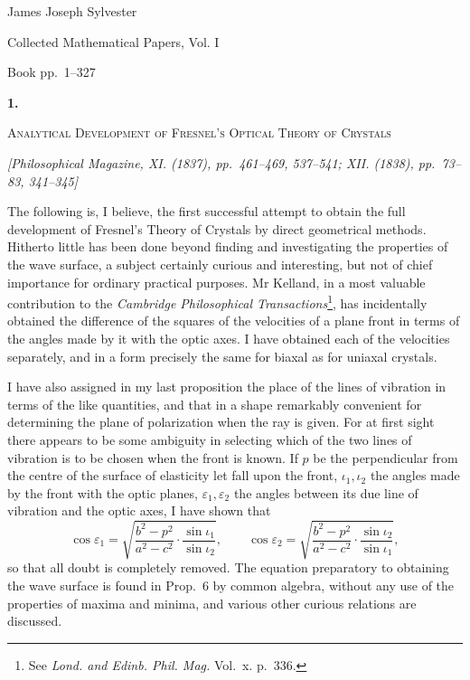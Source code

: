 \documentclass[11pt]{article}
\newcommand{\paperhead}[3]{%
  \clearpage
  \begin{center}
  {\Large\bfseries #1.}\par\vspace{0.85em}
  {\large\scshape #2}\par\vspace{0.6em}
  {\itshape [#3]}\par
  \end{center}\vspace{0.4em}}
\newcommand{\sourcepage}[1]{\marginpar{\scriptsize p.~#1}}
\begin{document}
\begin{center}
{\Large James Joseph Sylvester}\par\vspace{0.25em}
{\large Collected Mathematical Papers, Vol. I}\par\vspace{0.25em}
{\normalsize Book pp.~1--327}\par
\end{center}
\thispagestyle{empty}
\vspace{0.75em}

\paperhead{1}{Analytical Development of Fresnel's Optical Theory of Crystals}{Philosophical Magazine, XI. (1837), pp.~461--469, 537--541; XII. (1838), pp.~73--83, 341--345}

\sourcepage{1}
The following is, I believe, the first successful attempt to obtain the full development of Fresnel's Theory of Crystals by direct geometrical methods. Hitherto little has been done beyond finding and investigating the properties of the wave surface, a subject certainly curious and interesting, but not of chief importance for ordinary practical purposes. Mr Kelland, in a most valuable contribution to the \emph{Cambridge Philosophical Transactions}\footnote{See \emph{Lond. and Edinb. Phil. Mag.} Vol.~x. p.~336.}, has incidentally obtained the difference of the squares of the velocities of a plane front in terms of the angles made by it with the optic axes. I have obtained each of the velocities separately, and in a form precisely the same for biaxal as for uniaxal crystals.

I have also assigned in my last proposition the place of the lines of vibration in terms of the like quantities, and that in a shape remarkably convenient for determining the plane of polarization when the ray is given. For at first sight there appears to be some ambiguity in selecting which of the two lines of vibration is to be chosen when the front is known. If $p$ be the perpendicular from the centre of the surface of elasticity let fall upon the front, $\iota_1,\iota_2$ the angles made by the front with the optic planes, $\varepsilon_1,\varepsilon_2$ the angles between its due line of vibration and the optic axes, I have shown that
\[
\cos \varepsilon_1=
\sqrt{\frac{b^2-p^2}{a^2-c^2}\cdot\frac{\sin\iota_1}{\sin\iota_2}},
\qquad
\cos \varepsilon_2=
\sqrt{\frac{b^2-p^2}{a^2-c^2}\cdot\frac{\sin\iota_2}{\sin\iota_1}},
\]
so that all doubt is completely removed. The equation preparatory to obtaining the wave surface is found in Prop.~6 by common algebra, without any use of the properties of maxima and minima, and various other curious relations are discussed.
\end{document}
